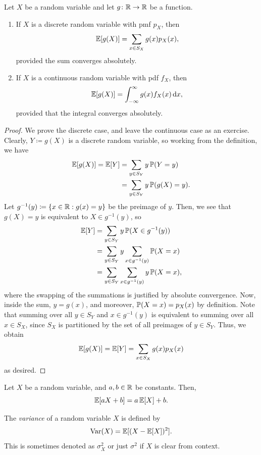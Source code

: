 \begin{proposition} \label{prop:lotus}
  Let $X$ be a random variable and let $g\colon \mathbb{R} \to \mathbb{R}$ be a function.
  \begin{enumerate}
    \item If $X$ is a discrete random variable with pmf $p_X$, then \[
        \operatorname{\mathbb{E}}[g(X)] = \sum_{x \in S_X} g(x) p_X(x),
      \] provided the sum converges absolutely.
    \item If $X$ is a continuous random variable with pdf $f_X$, then \[
        \E[g(X)] = \int_{-\infty}^{\infty} g(x)f_X(x) \dl x,
      \] provided that the integral converges absolutely.
  \end{enumerate}
\end{proposition}
\begin{proof}
  We prove the discrete case, and leave the continuous case as an exercise. Clearly, $Y \coloneq g(X)$ is a discrete random variable, so working from the definition, we have
  \begin{align*}
    \operatorname{\mathbb{E}}[g(X)] = \operatorname{\mathbb{E}}[Y] &= \sum_{y \in S_Y} y \operatorname{\mathbb{P}}(Y = y) \\
                     &= \sum_{y \in S_Y} y \operatorname{\mathbb{P}}(g(X) = y).
  \end{align*}
  Let $g^{-1}(y) \coloneq \{x \in \mathbb{R} : g(x) = y\}$ be the preimage of $y$. Then, we see that $g(X) = y$ is equivalent to $X \in g^{-1}(y)$, so 
  \begin{align*}
    \operatorname{\mathbb{E}}[Y] &= \sum_{y \in S_Y} y \operatorname{\mathbb{P}}(X \in g^{-1}(y)) \\
          &= \sum_{y \in S_Y} y \sum_{x \in g^{-1}(y)} \operatorname{\mathbb{P}}(X = x) \\
          &= \sum_{y \in S_Y} \sum_{x \in g^{-1}(y)} y \operatorname{\mathbb{P}}(X = x),
  \end{align*}
  where the swapping of the summations is justified by absolute convergence. Now, inside the sum, $y = g(x)$, and moreover,  $\operatorname{\mathbb{P}}(X = x) = p_X(x)$ by definition. Note that summing over all $y \in S_Y$ and $x \in g^{-1}(y)$ is equivalent to summing over all $x \in S_X$, since $S_X$ is partitioned by the set of all preimages of $y \in S_Y$. Thus, we obtain \[
    \operatorname{\mathbb{E}}[g(X)] = \operatorname{\mathbb{E}}[Y] = \sum_{x \in S_X} g(x) p_X(x)
  \] as desired.
\end{proof}

\begin{proposition}
  Let $X$ be a random variable, and $a, b \in \mathbb{R}$ be constants. Then, \[
    \operatorname{\mathbb{E}}[aX + b] = a\operatorname{\mathbb{E}}[X] + b.
  \] 
\end{proposition}

\begin{definition}
  The \emph{variance} of a random variable $X$ is defined by \[
    \operatorname{Var}(X) = \operatorname{\mathbb{E}}[(X - \operatorname{\mathbb{E}}[X])^2].
  \] This is sometimes denoted as $\sigma^2_X$ or just  $\sigma^2$ if $X$ is clear from context. 
\end{definition}


